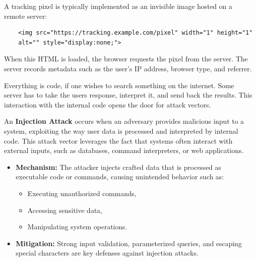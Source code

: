 \begin{Example}
    A tracking pixel is typically implemented as an invisible image hosted on a remote server:
    
    \begin{verbatim}
    <img src="https://tracking.example.com/pixel" width="1" height="1"
    alt="" style="display:none;">
    \end{verbatim}
    
    \noindent
    When this HTML is loaded, the browser requests the pixel from the server. The server records metadata such as the user's IP address, browser type, and referrer.
\end{Example}

\newpage

\noindent
Everything is code, if one wishes to search something on the internet.
Some server has to take the users response, interpret it, and send back the results.
This interaction with the internal code opens the door for attack vectors.

\begin{theo}

    \label{theo:injection_attacks}
    An \textbf{Injection Attack} occurs when an adversary provides malicious input to a system, exploiting the way user data is processed and interpreted by internal code. This attack vector leverages the fact that systems often interact with external inputs, such as databases, command interpreters, or web applications.
    
    \begin{itemize}
        \item \textbf{Mechanism:} The attacker injects crafted data that is processed as executable code or commands, causing unintended behavior such as:
        \begin{itemize}
            \item Executing unauthorized commands,
            \item Accessing sensitive data,
            \item Manipulating system operations.
        \end{itemize}
   
        \item \textbf{Mitigation:} Strong input validation, parameterized queries, and escaping special characters are key defenses against injection attacks.
    \end{itemize}
\end{theo}


